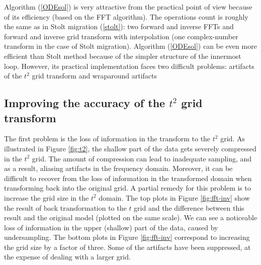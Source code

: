
Algorithm (\ref{ODEsol}) is very attractive from the practical point
of view because of its efficiency (based on the FFT algorithm). The
operations count is roughly the same as in Stolt migration
(\ref{stolt}): two forward and inverse FFTs and forward and inverse
grid transform with interpolation (one complex-number transform in the
case of Stolt migration). Algorithm (\ref{ODEsol}) can be even more
efficient than Stolt method because of the simpler structure of the
innermost loop.  However, its practical implementation faces two
difficult problems: artifacts of the $t^2$ grid transform and
wraparound artifacts
\par
\subsection{Improving the accuracy of the $t^2$ grid transform}
\par
The first problem is the loss of information in the transform to the
$t^2$ grid. As illustrated in Figure \ref{fig:t2}, the shallow part of
the data gets severely compressed in the $t^2$ grid. The amount of
compression can lead to inadequate sampling, and as a result, aliasing
artifacts in the frequency domain. Moreover, it can be difficult to
recover from the loss of information in the transformed domain when
transforming back into the original grid. A partial remedy for this
problem is to increase the grid size in the $t^2$ domain. The top plots
in Figure \ref{fig:fft-inv} show the result of back transformation to
the $t$ grid and the difference between this result and the original
model (plotted on the same scale). We can see a noticeable loss of
information in the upper (shallow) part of the data, caused by
undersampling. The bottom plots in Figure \ref{fig:fft-inv} correspond
to increasing the grid size by a factor of three. Some of the
artifacts have been suppressed, at the expense of dealing with a
larger grid.



